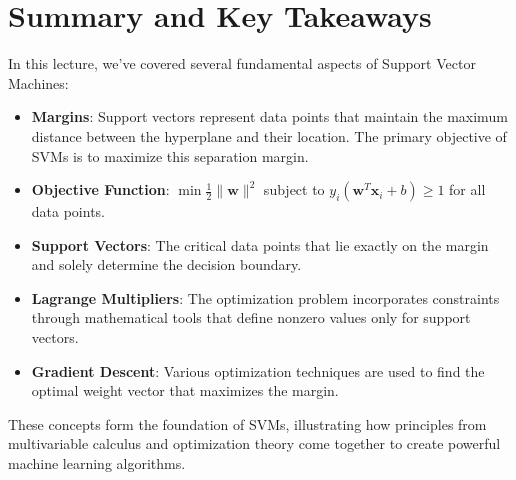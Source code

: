 \section{Summary and Key Takeaways}

In this lecture, we've covered several fundamental aspects of Support Vector Machines:

\begin{itemize}
    \item \textbf{Margins}: Support vectors represent data points that maintain the maximum distance between the hyperplane and their location. The primary objective of SVMs is to maximize this separation margin.
    \item \textbf{Objective Function}: $\min \frac{1}{2} \|\mathbf{w}\|^2$ subject to $y_i(\mathbf{w}^T\mathbf{x}_i + b) \geq 1$ for all data points.
    \item \textbf{Support Vectors}: The critical data points that lie exactly on the margin and solely determine the decision boundary.
    \item \textbf{Lagrange Multipliers}: The optimization problem incorporates constraints through mathematical tools that define nonzero values only for support vectors.
    \item \textbf{Gradient Descent}: Various optimization techniques are used to find the optimal weight vector that maximizes the margin.
\end{itemize}

These concepts form the foundation of SVMs, illustrating how principles from multivariable calculus and optimization theory come together to create powerful machine learning algorithms.
